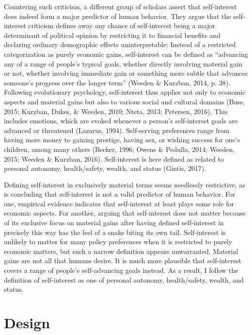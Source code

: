 \documentclass[12pt,econ]{sources/authesis}
\begin{document}
Countering such criticism, a different group of scholars assert that self-interest does indeed form a major predictor of human behavior. They argue that the self-interest criticism defines away any chance of self-interest being a major determinant of political opinion by restricting it to financial benefits and declaring ordinary demographic effects uninterpretable: Instead of a restricted categorization as purely economic gains, self-interest can be defined as ``advancing any of a range of people's typical goals, whether directly involving material gain or not, whether involving immediate gain or something more subtle that advances someone's progress over the longer term'' (Weeden \& Kurzban, 2014, p. 38). Following evolutionary psychology, self-interest thus applies not only to economic aspects and material gains but also to various social and cultural domains (Buss, 2015; Kurzban, Dukes, \& Weeden, 2010; Nteta, 2013; Petersen, 2016). This includes emotions, which are evoked whenever a person's self-interest goals are advanced or threatened (Lazarus, 1994). Self-serving preferences range from having more money to gaining prestige, having sex, or wishing success for one's children, among many others (Becker, 1996; Owens \& Pedulla, 2014; Weeden, 2015; Weeden \& Kurzban, 2016). Self-interest is here defined as related to personal autonomy, health/safety, wealth, and status (Gintis, 2017).

Defining self-interest in exclusively material terms seems needlessly restrictive, as is concluding that self-interest is not a valid predictor of human behavior. For one, empirical evidence indicates that self-interest at least plays some role for economic aspects. For another, arguing that self-interest does not matter because of its exclusive focus on material gains after having defined self-interest in precisely this way has the feel of a snake biting its own tail. Self-interest is unlikely to matter for many policy preferences when it is restricted to purely economic matters, but such a narrow definition appears unwarranted. Material gains are not all that humans desire. It is much more plausible that self-interest covers a range of people's self-advancing goals instead. As a result, I follow the definition of self-interest as one of personal autonomy, health/safety, wealth, and status.

\hypertarget{framing-design}{%
\section{Design}\label{framing-design}}
\end{document}

